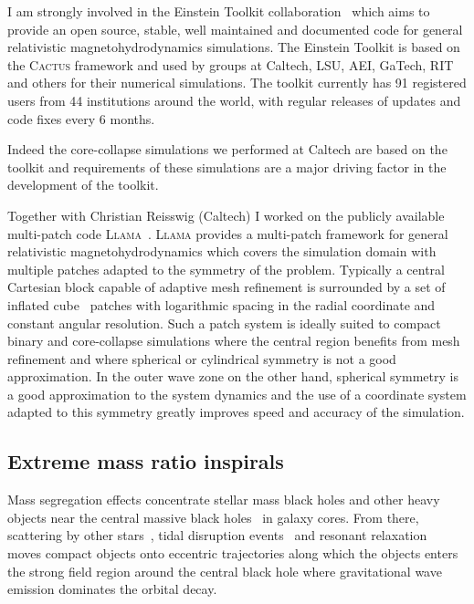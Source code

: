 \documentclass[12pt]{article}
\newcommand{\code}[1]{\textsc{#1}}
\newcommand{\ET}{Einstein Toolkit}
\begin{document}
I am strongly involved in the \ET{}
collaboration~\cite{2012CQGra..29k5001L} which aims to
provide an open source, stable, well maintained and documented code for 
general relativistic magnetohydrodynamics simulations. The \ET{}
is based on the \code{Cactus} framework and used by groups at Caltech,
LSU, AEI, GaTech, RIT and others for their numerical simulations. The toolkit
currently has 91 registered users from 44 institutions around the world, with
regular releases of updates and code fixes every 6 months. 

Indeed the core-collapse simulations we performed at Caltech are based on the
toolkit and requirements of these simulations are a major driving factor in
the development of the toolkit.

Together with Christian Reisswig (Caltech) I worked on the publicly available
multi-patch code \code{Llama}~\cite{Pollney:2009yz}.
\code{Llama} provides a multi-patch framework for general relativistic
magnetohydrodynamics which covers the simulation domain with multiple patches
adapted to the symmetry of the problem. Typically a central Cartesian block
capable of adaptive mesh refinement is surrounded by a set of inflated
cube~\cite{Thornburg:2004dv} patches with logarithmic
spacing in the radial coordinate and constant angular resolution. Such a
patch system is ideally suited to compact binary and core-collapse simulations
where the central region benefits from mesh refinement and where spherical
or cylindrical symmetry is not a good approximation. In the outer wave zone on
the other hand, spherical symmetry is a good approximation to the system
dynamics and the use of a coordinate system adapted to this symmetry greatly
improves speed and accuracy of the simulation. 

\subsection{Extreme mass ratio inspirals}
Mass segregation
effects concentrate stellar mass black holes and other heavy objects  near the
central massive black holes~\cite{1997MNRAS.284..318S,2000ApJ...545..847M} in
galaxy cores. %
From there, scattering by
other stars~\cite{2007CQGra..24R.113A}, 
tidal disruption events~\cite{2005ApJ...631L.117M} and resonant
relaxation~\cite{2006ApJ...645L.133H} %
moves compact objects onto eccentric trajectories along which the objects
enters
the strong field region around the central black hole 
where gravitational wave emission dominates the orbital decay. 
\end{document}
